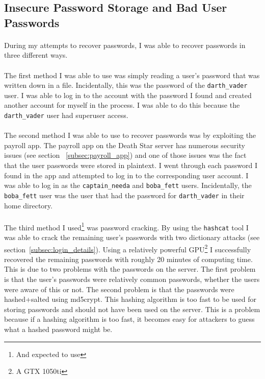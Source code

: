 \documentclass{article}
\begin{document}
\subsection{Insecure Password Storage and Bad User Passwords}
\label{subsec:bad_passwords}
\paragraph{}
During my attempts to recover passwords, I was able to recover passwords in three different ways.

\paragraph{}
The first method I was able to use was simply reading a user's password that was written down in a file. Incidentally, this was the password of the \texttt{darth\_vader} user.
I was able to log in to the account with the password I found and created another account for myself in the process. I was able to do this because the \texttt{darth\_vader} user had superuser access.

\paragraph{}
The second method I was able to use to recover passwords was by exploiting the payroll app.
The payroll app on the Death Star server has numerous security issues (see section ~\ref{subsec:payroll_app}) and one of those issues was the fact that the user passwords were stored in plaintext.
I went through each password I found in the app and attempted to log in to the corresponding user account.
I was able to log in as the \texttt{captain\_needa} and \texttt{boba\_fett} users. Incidentally, the \texttt{boba\_fett} user was the user that had the password for \texttt{darth\_vader} in their home directory.

\paragraph{}
The third method I used\footnote{And expected to use} was password cracking. By using the \texttt{hashcat} tool I was able to crack the remaining user's passwords with two dictionary attacks (see section~\ref{subsec:login_details}).
Using a relatively powerful GPU\footnote{A GTX 1050ti} I successfully recovered the remaining passwords with roughly 20 minutes of computing time.
This is due to two problems with the passwords on the server.
The first problem is that the user's passwords were relatively common passwords, whether the users were aware of this or not.
The second problem is that the passwords were hashed+salted using md5crypt.
This hashing algorithm is too fast to be used for storing passwords and should not have been used on the server.
This is a problem because if a hashing algorithm is too fast, it becomes easy for attackers to guess what a hashed password might be.
\end{document}
